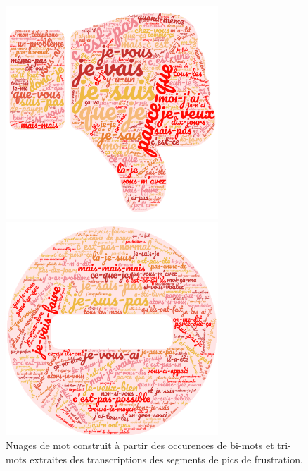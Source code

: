 \begin{figure}[h]
  \centering
  \begin{minipage}[b]{0.49\linewidth}
      \center
      \centerline{\includegraphics[width=8cm]{./Chapitre7/figures/bigram_pentu.png}}
  \end{minipage}
  \begin{minipage}[b]{0.49\linewidth}
      \center
      \centerline{\includegraphics[width=8cm]{./Chapitre7/figures/trigram_pentu.png}}
  \end{minipage}
    \caption{Nuages de mot construit à partir des occurences de bi-mots et tri-mots extraites des transcriptions des segments de pics de frustration.}
    \label{fig:nuageMot}
\end{figure}
